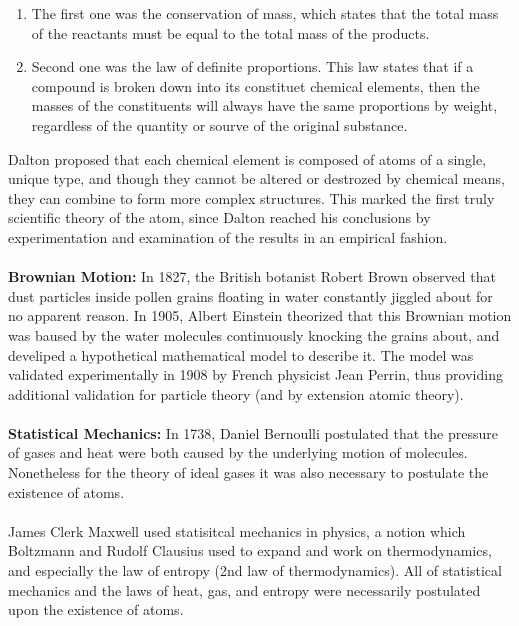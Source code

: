 \documentclass[10pt,a4paper]{article}
\newcounter{theo}
\begin{document}
\begin{enumerate}
    \item The first one was the conservation of mass, which states that the total mass of the reactants must be equal to the total mass of the products.
    \item Second one was the law of definite proportions. This law states that if a compound is broken down into its constituet chemical elements, then the masses of the constituents will always have the same proportions by weight, regardless of the quantity or sourve of the original substance.
\end{enumerate}

Dalton proposed that each chemical element is composed of atoms of a single, unique type, and though they cannot be altered or destrozed by chemical means, they can combine to form more complex structures. This marked the first truly scientific theory of the atom, since Dalton reached his conclusions by experimentation and examination of the results in an empirical fashion.
\\
\\
\textbf{Brownian Motion:} In 1827, the British botanist Robert Brown observed that dust particles inside pollen grains floating in water constantly jiggled about for no apparent reason. In 1905, Albert Einstein theorized that this Brownian motion was baused by the water molecules continuously knocking the grains about, and develiped a hypothetical mathematical model to describe it. The model was validated experimentally in 1908 by French physicist Jean Perrin, thus providing additional validation for particle theory (and by extension atomic theory).
\\
\\
\textbf{Statistical Mechanics:} In 1738, Daniel Bernoulli postulated that the pressure of gases and heat were both caused by the underlying motion of molecules. Nonetheless for the theory of ideal gases it was also necessary to postulate the existence of atoms.
\\
\\
James Clerk Maxwell used statisitcal mechanics in physics, a notion which Boltzmann and Rudolf Clausius used to expand and work on thermodynamics, and especially the law of entropy (2nd law of thermodynamics). All of statistical mechanics and the laws of heat, gas, and entropy were necessarily postulated upon the existence of atoms.
\end{document}
